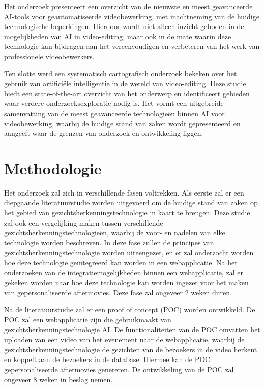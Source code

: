 Het onderzoek presenteert een overzicht van de nieuwste en meest geavanceerde AI-tools voor geautomatiseerde videobewerking, met inachtneming van de huidige technologische beperkingen. Hierdoor wordt niet alleen inzicht geboden in de mogelijkheden van AI in video-editing, maar ook in de mate waarin deze technologie kan bijdragen aan het vereenvoudigen en verbeteren van het werk van professionele videobewerkers.

Ten slotte werd een systematisch cartografisch onderzoek bekeken over het gebruik van artificiële intelligentie in de wereld van video-editing\autocite{IgorBieda}. Deze studie biedt een state-of-the-art overzicht van het onderwerp en identificeert gebieden waar verdere onderzoeksexploratie nodig is. Het vormt een uitgebreide samenvatting van de meest geavanceerde technologieën binnen AI voor videobewerking, waarbij de huidige stand van zaken wordt gepresenteerd en aangeeft waar de grenzen van onderzoek en ontwikkeling liggen.




\section{Methodologie}%
\label{sec:methodologie}

Het onderzoek zal zich in verschillende fasen voltrekken.
Als eerste zal er een diepgaande literatuurstudie worden uitgevoerd om de huidige stand van zaken op het gebied van gezichtsherkenningstechnologie in kaart te brengen.
Deze studie zal ook een vergelijking maken tussen verschillende gezichtsherkenningstechnologieën, waarbij de voor- en nadelen van elke technologie worden beschreven.
In deze fase zullen de principes van gezichtsherkenningstechnologie worden uiteengezet,
en er zal onderzocht worden hoe deze technologie geïntegreerd kan worden in een webapplicatie.
Na het onderzoeken van de integratiemogelijkheden binnen een webapplicatie,
zal er gekeken worden naar hoe deze technologie kan worden ingezet voor het maken van gepersonaliseerde aftermovies. Deze fase zal ongeveer 2 weken duren.

Na de literatuurstudie zal er een proof of concept (POC) worden ontwikkeld.
De POC zal een webapplicatie zijn die gebruikmaakt van gezichtsherkenningstechnologie AI.
De functionaliteiten van de POC omvatten het uploaden van een video van het evenement naar de webapplicatie,
waarbij de gezichtsherkenningstechnologie de gezichten van de bezoekers in de video herkent en koppelt aan de bezoekers in de database.
Hiermee kan de POC gepersonaliseerde aftermovies genereren. De ontwikkeling van de POC zal ongeveer 8 weken in beslag nemen.

